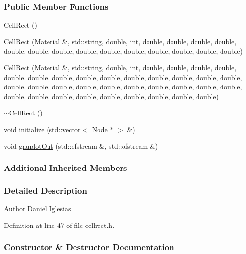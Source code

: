 \subsubsection*{Public Member Functions}
\begin{DoxyCompactItemize}
\item 
\hyperlink{classmknix_1_1_cell_rect_a7cc280eb130683f2b8d77ce04d3f7e84}{Cell\+Rect} ()
\item 
\hyperlink{classmknix_1_1_cell_rect_a5242df2938d1f9f60cd089c5309fa1c2}{Cell\+Rect} (\hyperlink{classmknix_1_1_material}{Material} \&, std\+::string, double, int, double, double, double, double, double, double, double, double, double, double, double, double, double, double)
\item 
\hyperlink{classmknix_1_1_cell_rect_a16a49a17652e7941217e1089bb243a6f}{Cell\+Rect} (\hyperlink{classmknix_1_1_material}{Material} \&, std\+::string, double, int, double, double, double, double, double, double, double, double, double, double, double, double, double, double, double, double, double, double, double, double, double, double, double, double, double, double, double, double, double, double, double, double, double)
\item 
\hyperlink{classmknix_1_1_cell_rect_a966a8afa0dee4990f8231cb7e32d33ee}{$\sim$\+Cell\+Rect} ()
\item 
void \hyperlink{classmknix_1_1_cell_rect_a599daac72085b935a90afe8ffcecdd20}{initialize} (std\+::vector$<$ \hyperlink{classmknix_1_1_node}{Node} $\ast$ $>$ \&)
\item 
void \hyperlink{classmknix_1_1_cell_rect_aff6050da82b250a264f856743b0225e0}{gnuplot\+Out} (std\+::ofstream \&, std\+::ofstream \&)
\end{DoxyCompactItemize}
\subsubsection*{Additional Inherited Members}


\subsubsection{Detailed Description}
\begin{DoxyAuthor}{Author}
Daniel Iglesias 
\end{DoxyAuthor}


Definition at line 47 of file cellrect.\+h.



\subsubsection{Constructor \& Destructor Documentation}
\hypertarget{classmknix_1_1_cell_rect_a7cc280eb130683f2b8d77ce04d3f7e84}{}
